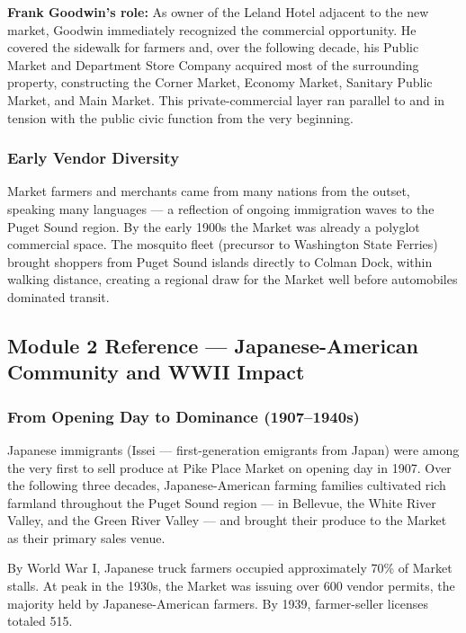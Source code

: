 \documentclass[11pt,letterpaper]{article}
\begin{document}
\textbf{Frank Goodwin's role:} As owner of the Leland Hotel adjacent to the new market, Goodwin immediately recognized the commercial opportunity. He covered the sidewalk for farmers and, over the following decade, his Public Market and Department Store Company acquired most of the surrounding property, constructing the Corner Market, Economy Market, Sanitary Public Market, and Main Market. This private-commercial layer ran parallel to and in tension with the public civic function from the very beginning.

\subsubsection{Early Vendor Diversity}

Market farmers and merchants came from many nations from the outset, speaking many languages --- a reflection of ongoing immigration waves to the Puget Sound region. By the early 1900s the Market was already a polyglot commercial space. The mosquito fleet (precursor to Washington State Ferries) brought shoppers from Puget Sound islands directly to Colman Dock, within walking distance, creating a regional draw for the Market well before automobiles dominated transit.

\subsection{Module 2 Reference --- Japanese-American Community and WWII Impact}

\subsubsection{From Opening Day to Dominance (1907--1940s)}

Japanese immigrants (Issei --- first-generation emigrants from Japan) were among the very first to sell produce at Pike Place Market on opening day in 1907. Over the following three decades, Japanese-American farming families cultivated rich farmland throughout the Puget Sound region --- in Bellevue, the White River Valley, and the Green River Valley --- and brought their produce to the Market as their primary sales venue.

By World War I, Japanese truck farmers occupied approximately 70\% of Market stalls. At peak in the 1930s, the Market was issuing over 600 vendor permits, the majority held by Japanese-American farmers. By 1939, farmer-seller licenses totaled 515.
\end{document}
